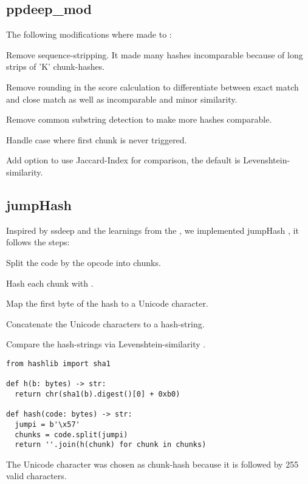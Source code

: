 \documentclass[../main.tex]{subfiles}
\begin{document}
\subsection{ppdeep\_mod \label{sec:ppdeep_mod}}
The following modifications where made to :
\begin{ul}
  \item Remove sequence-stripping. It made many hashes incomparable because of long strips of 'K' chunk-hashes.
  \item Remove rounding in the score calculation to differentiate between exact match and close match as well as incomparable and minor similarity.
  \item Remove common substring detection to make more hashes comparable.
  \item Handle case where first chunk is never triggered.
  \item Add option to use Jaccard-Index for comparison, the default is Levenshtein-similarity.
\end{ul}

\subsection{jumpHash \label{sec:jump}}
Inspired by ssdeep and the learnings from the , we implemented jumpHash \cite{ethereum-contract-similarity}, it follows the steps:
\begin{ol}
  \item Split the code by the opcode  into chunks.
  \item Hash each chunk with .
  \item Map the first byte of the  hash to a Unicode character.
  \item Concatenate the Unicode characters to a hash-string.
  \item Compare the hash-strings via Levenshtein-similarity .
\end{ol}
\begin{lstlisting}[style=pymd]
from hashlib import sha1

def h(b: bytes) -> str:
  return chr(sha1(b).digest()[0] + 0xb0)

def hash(code: bytes) -> str:
  jumpi = b'\x57'
  chunks = code.split(jumpi)
  return ''.join(h(chunk) for chunk in chunks)
\end{lstlisting}
The Unicode character  was chosen as  chunk-hash because it is followed by 255 valid characters.
\end{document}
